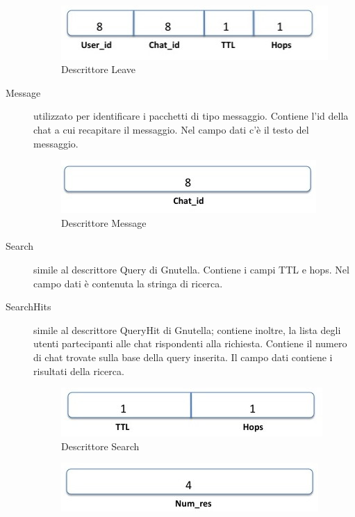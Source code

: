 \begin{description}
\begin{figure}[H]
\begin{center}
\includegraphics[scale=0.7]{etc/leave.jpg}
\caption{Descrittore Leave}
\label{leave}
\end{center}
\end{figure}
\item[Message] utilizzato per identificare i pacchetti di tipo messaggio. Contiene l’id della chat a cui recapitare il messaggio. Nel campo dati c'è il testo del messaggio.
\begin{figure}[H]
\begin{center}
\includegraphics[scale=0.7]{etc/message.jpg}
\caption{Descrittore Message}
\label{message}
\end{center}
\end{figure}
\item[Search] simile al descrittore Query di Gnutella. Contiene i campi TTL e hops. Nel campo dati è contenuta la stringa di ricerca.
\item[SearchHits] simile al descrittore QueryHit di Gnutella; contiene inoltre, la lista degli utenti partecipanti alle chat rispondenti alla richiesta. Contiene il numero di chat trovate sulla base della query inserita. Il campo dati contiene i risultati della ricerca.
\begin{figure}[H]
\begin{center}
\includegraphics[scale=0.7]{etc/search.jpg}
\caption{Descrittore Search}
\label{search}
\end{center}
\end{figure}
\begin{figure}[H]
\begin{center}
\includegraphics[scale=0.7]{etc/searchhits.jpg}

\end{center}
\end{figure}
\end{description}
